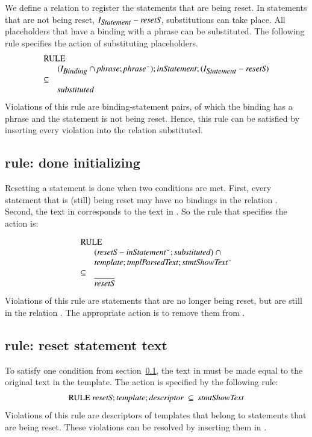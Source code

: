 \documentclass{elsarticle}
\begin{document}
	We define a relation  to register the statements that are being reset.
    In statements that are not being reset, $I_{\text{\em \small Statement\/}}-\text{\em resetS\/}$, substitutions can take place.
	All placeholders that have a binding with a phrase can be substituted. 
	The following rule specifies the action of substituting placeholders.
\begin{displaymath}
\begin{array}{rl}
\multicolumn{2}{l}{\text{RULE}}\\
&(\ident{Binding}\cap \id{phrase} ;\flip{\id{phrase}});\id{inStatement} ;(\ident{Statement} - \id{resetS})\\
\subs\\
&\id{substituted}
\end{array}
\end{displaymath}
	Violations of this rule are binding-statement pairs, of which the binding has a phrase and the statement is not being reset.
	Hence, this rule can be satisfied by inserting every violation into the relation substituted.

\subsection{rule: done initializing}
\label{rule: done initializing}
	Resetting a statement is done when two conditions are met.
	First, every statement that is (still) being reset may have no bindings in the relation .
	Second, the text in  corresponds to the text in .
	So the rule that specifies the action is:

\begin{displaymath}
\begin{array}{rl}
\multicolumn{2}{l}{\text{RULE}}\\
&(\id{resetS} - \flip{\id{inStatement}};\id{substituted})\ \cap\\
&\id{template} ;\id{tmplParsedText} ;\flip{\id{stmtShowText}}\\
\subs\\
&\overline{\id{resetS}}
\end{array}
\end{displaymath}
	Violations of this rule are statements that are no longer being reset, but are still in the relation .
	The appropriate action is to remove them from .

\subsection{rule: reset statement text}
\label{rule: reset statement text}
	To satisfy one condition from section~\ref{rule: done initializing},
	the text in  must be made equal to the original text in the template.
	The action is specified by the following rule:
\[\text{RULE}\ \id{resetS} ;\id{template} ;\id{descriptor}\ \subs\ \id{stmtShowText} \]
	Violations of this rule are descriptors of templates that belong to statements that are being reset.
	These violations can be resolved by inserting them in .
\end{document}
